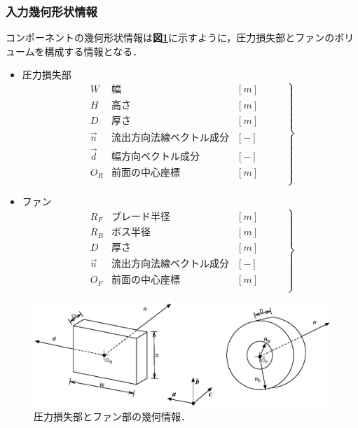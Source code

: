 \subsubsection{入力幾何形状情報}
コンポーネントの幾何形状情報は\textbf{図\ref{fig:geometry_info}}に示すように，圧力損失部とファンのボリュームを構成する情報となる．
\begin{itemize}
\item 圧力損失部
{\small
\begin{equation}
\left.
\begin{array}{lll}
W  & 幅  &  [m] \\
H  & 高さ  & [m] \\
D  & 厚さ  & [m] \\
\overrightarrow{n} & 流出方向法線ベクトル成分 & [-] \\
\overrightarrow{d} & 幅方向ベクトル成分 & [-] \\
O_R & 前面の中心座標 & [m] \\
\end{array} \hspace{1cm} \right\}
\end{equation}
}

\item ファン
{\small
\begin{equation}
\left.
\begin{array}{lll}
R_F  & ブレード半径  &  [m] \\
R_B  & ボス半径  & [m] \\
D  & 厚さ  & [m] \\
\overrightarrow{n} & 流出方向法線ベクトル成分 & [-] \\
O_F & 前面の中心座標 & [m] \\
\end{array} \hspace{1cm} \right\}
\end{equation}
}

\end{itemize}


\begin{figure}[htbp]
\begin{center}
\includegraphics[width=12cm,clip]{compo_dim.eps}
\end{center}
\caption{圧力損失部とファン部の幾何情報．}
\label{fig:geometry_info}
\end{figure}

